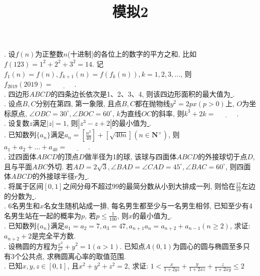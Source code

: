 \documentclass[10pt,column,letterpaper]{article}
\title{模拟2}
\author{}
\theoremstyle{mythmstyle}
\begin{document}
\maketitle
\large
{}. 设$f(n)$为正整数$n$(十进制)的各位上的数字的平方之和, 比如 $f(123) = 1^2 + 2^2 + 3^2 = 14$. 记$f_1(n) = f(n), f_{k+1}(n) = f(f_{k}(n)), k=1,2,3,\dots $, 则$f_{2019}(2019)=\underline{ \quad \quad  \quad  }$.\\

. 四边形$ABCD$的四条边长依次是1、2、3、4, 则该四边形面积的最大值为\underline{ \quad \quad  \quad  }.\\

. 设点$B,C$分别在第四, 第一象限, 且点$B, C$都在抛物线$y^2 = 2px(p>0)$上, $O$为坐标原点, $\angle OBC = 30^{\circ}, \angle BOC = 60^{\circ}$, $k$为直线$OC$的斜率, 则$k^3 + 2k = \underline{ \quad \quad  \quad  }$.\\

. 设复数$z$满足$\left|z\right| = 1$, 则$\left|z^3 - z + 2 \right|$的最小值为\underline{ \quad \quad  \quad  }.\\

. 已知数列$\{a_n\}$满足$a_n = \left[\frac{n^2}{40}\right] + \left[\sqrt{40n}\right](n \in \bm{N^{+}})$, 则$a_1 + a_2 + \dots + a_{40} = \underline{ \quad \quad  \quad  }$.\\

. 过四面体$ABCD$的顶点$D$做半径为1的球, 该球与四面体$ABCD$的外接球切于点$D$, 且与平面$ABC$外切. 若$AD = 2\sqrt{3}, \angle BAD = \angle CAD = 45^{\circ}, \angle BAC = 60^{\circ}$, 则四面体$ABCD$的外接球半径$r$为\underline{ \quad \quad  \quad  } .\\

. 将属于区间$[0,1]$之间分母不超过99的最简分数从小到大排成一列, 则恰在$\frac{17}{16}$左边的分数为\underline{ \quad \quad  \quad  } .\\

. 6名男生和$x$名女生随机站成一排, 每名男生都至少与一名男生相邻, 已知至少有4名男生站在一起的概率为$p$, 若$p \leq \frac{1}{100}$, 则$x$的最小值为\underline{ \quad \quad  \quad  }.\\

. 已知数列$\{a_n\}$满足$a_1 = a_2 = 7, a_3 = 47, a_{n+1}a_{n} = a_{n+2} + a_{n-1}(n \geq 2)$, 求证: $a_{n+2} + 2$是完全平方数.\\

. 设椭圆的方程为$\frac{x^{2}}{a^2} + y^2 = 1 (a>1)$. 已知点$A(0,1)$为圆心的圆与椭圆至多只有3个公共点, 求椭圆离心率的取值范围.\\

. 已知$x,y,z \in [0,1]$, 且$x^2 + y^2 + z^2 = 2 $, 求证:
$1<\frac{x}{1+2yz} + \frac{y}{1+2xz} + \frac{z}{1+2xy} \leq 2$
\end{document}
